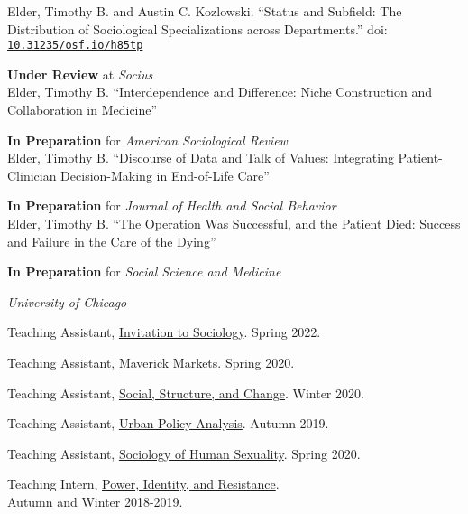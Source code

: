 \documentclass[11pt,article,oneside]{memoir}
\begin{document}
\ind Elder, Timothy B. and Austin C. Kozlowski. ``Status and Subfield: The Distribution of Sociological Specializations across Departments.'' doi: \texttt{\href{https://osf.io/preprints/socarxiv/h85tp/}{10.31235/osf.io/h85tp}} \\
	\strut\hspace{0.4in} \footnotesize \textbf{Under Review} at \textit{Socius} \normalsize \\

\ind Elder, Timothy B. ``Interdependence and Difference: Niche Construction and Collaboration in Medicine'' \\
	\strut\hspace{0.4in} \footnotesize \textbf{In Preparation} for \textit{American Sociological Review} \normalsize\\

\ind Elder, Timothy B. ``Discourse of Data and Talk of Values: Integrating Patient-Clinician Decision-Making in End-of-Life Care'' \\
	\strut\hspace{0.4in} \footnotesize \textbf{In Preparation} for \textit{Journal of Health and Social Behavior} \normalsize \\

\ind Elder, Timothy B. ``The Operation Was Successful, and the Patient Died: Success and Failure in the Care of the Dying'' \\
	\strut\hspace{0.4in} \footnotesize \textbf{In Preparation} for \textit{Social Science and Medicine} \normalsize \\

\bigskip

\medskip
\noindent\emph{University of Chicago \vspace{0.01in}}

\ind Teaching Assistant, \underline{Invitation to Sociology}. Spring 2022.

\ind Teaching Assistant, \underline{Maverick Markets}. Spring 2020.

\ind Teaching Assistant, \underline{Social, Structure, and Change}. Winter 2020.

\ind Teaching Assistant, \underline{Urban Policy Analysis}. Autumn 2019.

\ind Teaching Assistant, \underline{Sociology of Human Sexuality}. Spring 2020.

\ind Teaching Intern, \underline{Power, Identity, and Resistance}. \\ Autumn and Winter 2018-2019.
\end{document}
